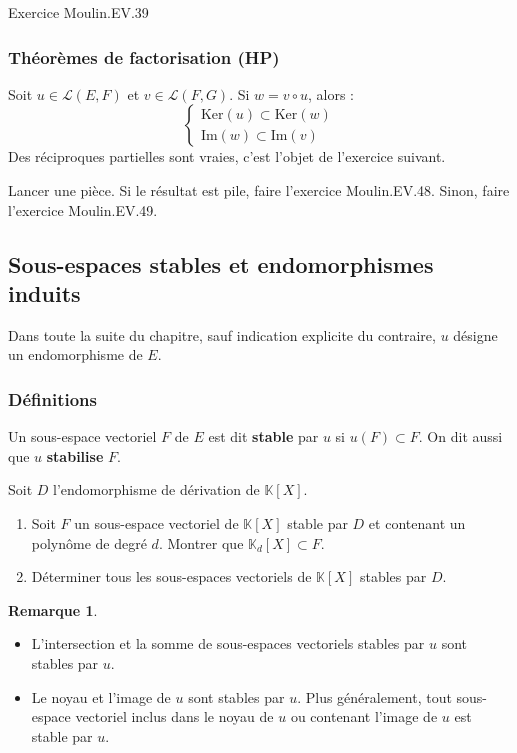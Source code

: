 \documentclass[french]{article}
\newcommand{\K}{\mathbb{K}}
\renewcommand{\ker}{\text{Ker}}
\theoremstyle{plain}
\theoremstyle{definition}
\newtheorem*{rmq}{Remarque}
\theoremstyle{remark}
\begin{document}
Exercice Moulin.EV.39

\subsubsection*{Théorèmes de factorisation (HP)}
Soit $u\in\mathcal{L}(E,F)$ et $v\in\mathcal{L}(F,G)$. Si $w=v\circ u$, alors : $$\begin{cases}
	\ker(u)\subset\ker(w)\\
	\text{Im}(w)\subset\text{Im}(v)
\end{cases}$$ Des réciproques partielles sont vraies, c'est l'objet de l'exercice suivant.

\begin{exo}
	Lancer une pièce. Si le résultat est pile, faire l'exercice Moulin.EV.48. Sinon, faire l'exercice Moulin.EV.49.
\end{exo}

\subsection{Sous-espaces stables et endomorphismes induits}

Dans toute la suite du chapitre, sauf indication explicite du contraire, $u$ désigne un endomorphisme de $E$.

\subsubsection*{Définitions}

\begin{dfn}
	Un sous-espace vectoriel $F$ de $E$ est dit \textbf{stable} par $u$ si $u(F)\subset F$. On dit aussi que $u$ \textbf{stabilise} $F$.
\end{dfn}

\begin{exo}
	Soit $D$ l'endomorphisme de dérivation de $\K[X]$.
	\begin{enumerate}
		\item Soit $F$ un sous-espace vectoriel de $\K[X]$ stable par $D$ et contenant un polynôme de degré $d$. Montrer que $\K_d[X]\subset F$.
		\item Déterminer tous les sous-espaces vectoriels de $\K[X]$ stables par $D$.
	\end{enumerate}
\end{exo}

\begin{rmq}
	\begin{itemize}
		\item L'intersection et la somme de sous-espaces vectoriels stables par $u$ sont stables par $u$.
		\item Le noyau et l'image de $u$ sont stables par $u$. Plus généralement, tout sous-espace vectoriel inclus dans le noyau de $u$ ou contenant l'image de $u$ est stable par $u$.
	\end{itemize}
\end{rmq}
\end{document}
